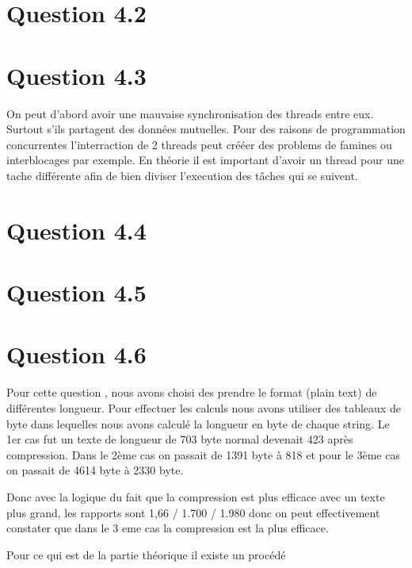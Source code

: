 \documentclass[12pt]{article}
\begin{document}
\section*{Question 4.2}

\section*{Question 4.3}
On peut d'abord avoir une mauvaise synchronisation des threads entre eux. Surtout s'ils partagent des données mutuelles. Pour des raisons de programmation concurrentes l'interraction de 2 threads peut crééer des problems de famines ou interblocages par exemple.
En théorie il est important d'avoir un thread pour une tache différente afin de bien diviser l'execution des tâches qui se suivent.

\section*{Question 4.4}

\section*{Question 4.5}

\section*{Question 4.6}
Pour cette question , nous avons choisi des prendre le format (plain text) de différentes longueur.
Pour effectuer les calculs nous avons utiliser des tableaux de byte dans lequelles nous avons calculé  la longueur en byte de chaque string.
Le 1er cas fut un texte de longueur de 703 byte normal devenait 423 après compression.
Dans le 2ème cas on passait de 1391 byte à 818 et pour le 3ème cas on passait de 4614 byte à 2330 byte.

Donc avec la logique du fait que la compression est plus efficace avec un texte plus grand,
les rapports sont 1,66 / 1.700 / 1.980 donc on peut effectivement constater que dans le 3 eme cas la
compression est la plus efficace.


Pour ce qui est de la partie théorique il existe un procédé 
\end{document}
